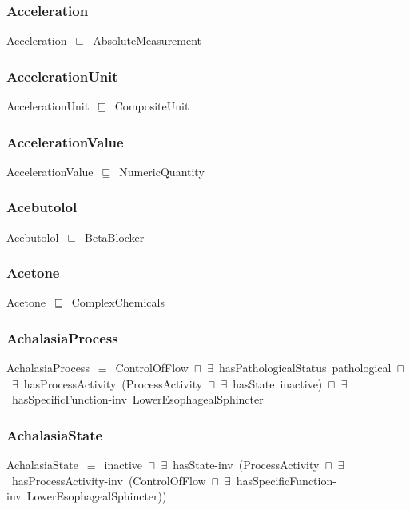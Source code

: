 \documentclass{article}
\begin{document}
\subsubsection*{Acceleration}

Acceleration~\ensuremath{\sqsubseteq}~AbsoluteMeasurement~

\subsubsection*{AccelerationUnit}

AccelerationUnit~\ensuremath{\sqsubseteq}~CompositeUnit~

\subsubsection*{AccelerationValue}

AccelerationValue~\ensuremath{\sqsubseteq}~NumericQuantity~

\subsubsection*{Acebutolol}

Acebutolol~\ensuremath{\sqsubseteq}~BetaBlocker~

\subsubsection*{Acetone}

Acetone~\ensuremath{\sqsubseteq}~ComplexChemicals~

\subsubsection*{AchalasiaProcess}

AchalasiaProcess~\ensuremath{\equiv}~ControlOfFlow~\ensuremath{\sqcap}~\ensuremath{\exists}~hasPathologicalStatus~pathological~\ensuremath{\sqcap}~\ensuremath{\exists}~hasProcessActivity~(ProcessActivity~\ensuremath{\sqcap}~\ensuremath{\exists}~hasState~inactive)~\ensuremath{\sqcap}~\ensuremath{\exists}~hasSpecificFunction-inv~LowerEsophagealSphincter

\subsubsection*{AchalasiaState}

AchalasiaState~\ensuremath{\equiv}~inactive~\ensuremath{\sqcap}~\ensuremath{\exists}~hasState-inv~(ProcessActivity~\ensuremath{\sqcap}~\ensuremath{\exists}~hasProcessActivity-inv~(ControlOfFlow~\ensuremath{\sqcap}~\ensuremath{\exists}~hasSpecificFunction-inv~LowerEsophagealSphincter))
\end{document}
